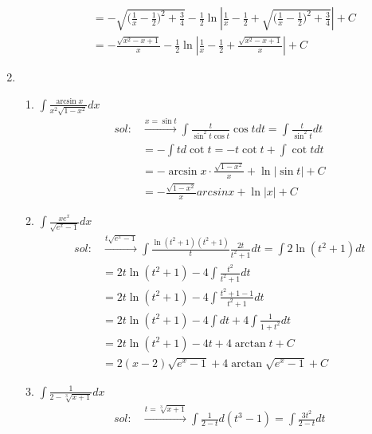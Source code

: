\begin{enumerate}[{例}1.]
\begin{enumerate}[(1)]
\begin{align*}
                            &=-\sqrt{\bigg(\frac{1}{x}-\frac{1}{2}\bigg)^2+\frac{3}{4}}-\frac{1}{2}\ln\left|\frac{1}{x}-\frac{1}{2}+\sqrt{\bigg(\frac{1}{x}-\frac{1}{2}\bigg)^2+\frac{3}{4}}\right|+C\\
                            &=-\frac{\sqrt{x^2-x+1}}{x}-\frac{1}{2}\ln\left|\frac{1}{x}-\frac{1}{2}+\frac{\sqrt{x^2-x+1}}{x}\right|+C
                    \end{align*}
            \end{enumerate}
    \item   \begin{enumerate}[(1)]
                \item $\int \frac{\arcsin x}{x^2\sqrt{1-x^2}}dx$
                    \begin{align*}
                        sol:&\xrightarrow{x=\sin t}\int\frac{t}{\sin^2 t\cos t}\cos tdt=\int\frac{t}{\sin^2 t}dt\\
                            &=-\int td\cot t=-t\cot t+\int\cot tdt\\
                            &=-\arcsin x\cdot\frac{\sqrt{1-x^2}}{x}+\ln\left|\sin t\right|+C\\
                            &=-\frac{\sqrt{1-x^2}}{x}arcsin x+\ln\left|x\right|+C
                    \end{align*}
                \item $\int \frac{xe^x}{\sqrt{e^x -1}}dx$
                    \begin{align*}
                        sol:&\xrightarrow{t\sqrt{e^x-1}}\int\frac{\ln(t^2+1)(t^2+1)}{t}\frac{2t}{t^2+1}dt=\int 2\ln(t^2+1)dt\\
                            &=2t\ln(t^2+1)-4\int\frac{t^2}{t^2+1}dt\\
                            &=2t\ln(t^2+1)-4\int\frac{t^2+1-1}{t^2+1}dt\\
                            &=2t\ln(t^2+1)-4\int dt+4\int\frac{1}{1+t^2}dt\\
                            &=2t\ln(t^2+1)-4t+4\arctan t+C\\
                            &=2(x-2)\sqrt{e^x-1}+4\arctan\sqrt{e^x-1}+C
                    \end{align*}
                \item $\int \frac{1}{2-\sqrt[3]{x+1}}dx$
                    \begin{align*}
                        sol:&\xrightarrow{t=\sqrt[3]{x+1}}\int\frac{1}{2-t}d(t^3-1)=\int\frac{3t^2}{2-t}dt\\

\end{align*}
\end{enumerate}
\end{enumerate}
